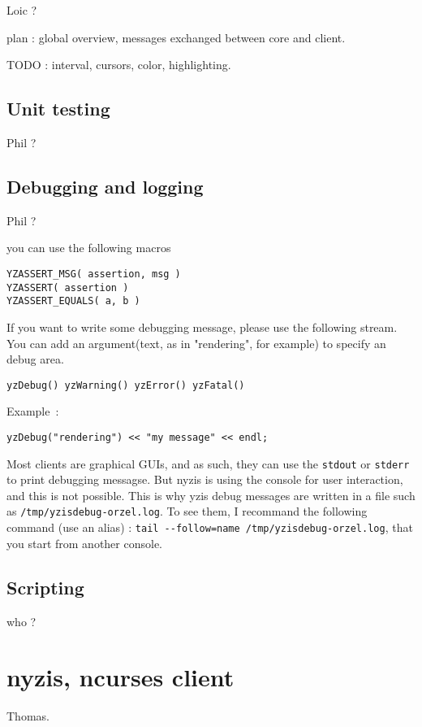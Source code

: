 \documentclass[a4paper,12pt]{report}
\begin{document}
Loic ?

plan : global overview, messages exchanged between core and client.

TODO : interval, cursors, color, highlighting.

\section{Unit testing}

Phil ?

\section{Debugging and logging}

Phil ?

you can use the following macros
\begin{verbatim}
YZASSERT_MSG( assertion, msg )
YZASSERT( assertion )
YZASSERT_EQUALS( a, b )
\end{verbatim}

If you want to write some debugging message, please use the following
stream. You can add an argument(text, as in "rendering", for example) to specify an debug area.
\begin{verbatim}
yzDebug() yzWarning() yzError() yzFatal()
\end{verbatim}
Example~:
\begin{verbatim}
yzDebug("rendering") << "my message" << endl;
\end{verbatim}

Most clients are graphical GUIs, and as such,
they can use the \verb+stdout+ or \verb+stderr+ to print debugging
messagse. But nyzis is using the console for user interaction, and this
is not possible. This is why yzis debug messages are written in a file such
as \verb+/tmp/yzisdebug-orzel.log+. To see them, I recommand the following
command (use an alias) : \verb+tail --follow=name /tmp/yzisdebug-orzel.log+,
that you start from another console.

\section{Scripting}

who ?

\chapter{nyzis, ncurses client}

Thomas.
\end{document}
